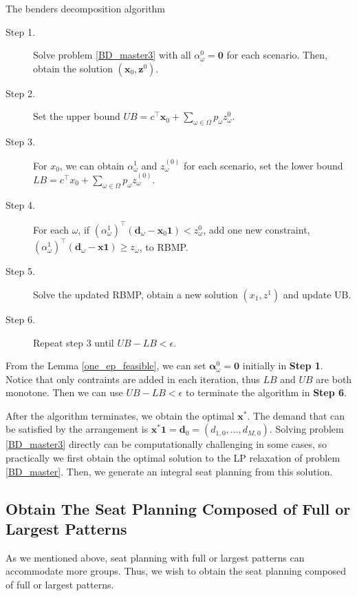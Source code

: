 \begin{algorithm}[H]\label{cut_algo}
  \caption{The benders decomposition algorithm}
    \begin{description}
    \item[Step 1.] Solve problem \eqref{BD_master3} with all $\alpha_{\omega}^0 = \mathbf{0}$ for each scenario. Then, obtain the solution $(\mathbf{x}_0, \mathbf{z}^{0})$.
    \item[Step 2.] Set the upper bound $UB = c^{\intercal} \mathbf{x}_0 + \sum_{\omega \in \Omega} p_{\omega} z_{\omega}^{0}$.
    \item[Step 3.] For $x_0$, we can obtain $\alpha_{\omega}^{1}$ and $z_{\omega}^{(0)}$ for each scenario, set the lower bound $LB = c^{\intercal} x_0 + \sum_{\omega \in \Omega} p_{\omega} z_{\omega}^{(0)}$.
    \item[Step 4.] For each $\omega$, if $(\alpha_{\omega}^{1})^{\intercal}(\mathbf{d}_{\omega}- \mathbf{x}_0 \mathbf{1}) < z_{\omega}^{0}$, add one new constraint, $(\alpha_{\omega}^{1})^{\intercal}(\mathbf{d}_{\omega}- \mathbf{x} \mathbf{1}) \geq z_{\omega}$, to RBMP.
    \item[Step 5.] Solve the updated RBMP, obtain a new solution $(x_1, z^{1})$ and update UB.
    \item[Step 6.] Repeat step 3 until $UB - LB < \epsilon$.
   \end{description}
  \end{algorithm}

From the Lemma \ref{one_ep_feasible}, we can set $\bm{\alpha}_{\omega}^0 = \mathbf{0}$ initially in {\bf Step 1}. Notice that only contraints are added in each iteration, thus $LB$ and $UB$ are both monotone. Then we can use $UB - LB < \epsilon$ to terminate the algorithm in {\bf Step 6}.


After the algorithm terminates, we obtain the optimal $\mathbf{x}^{*}$. The demand that can be satisfied by the arrangement is $\mathbf{x}^{*} \mathbf{1} = \mathbf{d}_0 = (d_{1,0},\ldots,d_{M,0})$. Solving problem \eqref{BD_master3} directly can be computationally challenging in some cases, so practically we first obtain the optimal solution to the LP relaxation of problem \eqref{BD_master}. Then, we generate an integral seat planning from this solution.

\subsection{Obtain The Seat Planning Composed of Full or Largest Patterns}\label{seat_assignment}
As we mentioned above, seat planning with full or largest patterns can accommodate more groups. Thus, we wish to obtain the seat planning composed of full or largest patterns.

